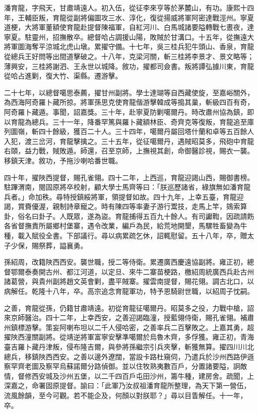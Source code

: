 \begin{pinyinscope}
潘育龍，字飛天，甘肅靖遠人。初入伍，從征李來亨等於茅麓山，有功。康熙十四年，王輔臣叛，育龍從副將偏圖攻三水、淳化，復從揚威將軍阿密達戰涇州。寧夏道梗，大將軍董額使育龍赴提督陳福軍，自紅河川、白馬城諸要隘轉戰七晝夜，達寧夏。駐靈州，招撫散卒。總督哈占調援山陽，敗賊於甘溝口。十五年，從撫遠大將軍圖海奪平涼城北虎山墩。累擢守備。十七年，吳三桂兵犯牛頭山、香泉，育龍從總兵王好問等出間道擊破之。十八年，克梁河關，斬三桂將李景才、景文略等；薄興安，三桂將謝泗、王永世以城降。敘功，擢都司僉書。叛將譚弘據川東，育龍從哈占進剿，復大竹、渠縣。遷游擊。

二十七年，以總督噶思泰薦，擢甘州副將。學士達瑚等自西藏使旋，至嘉峪關外，為西海阿奇羅卜藏所掠。將軍孫思克使育龍偕游擊韓成等搗其巢，斬級四百有奇，阿奇羅卜藏遁。事聞，詔嘉獎。三十年，赴寧夏防剿噶爾丹。時改肅州協為鎮，即以育龍為總兵。三十一年，降番罕篤與羅卜藏額林臣、奇齊克等復叛，育龍追至庫列圖嶺，斬四十餘級，獲百二十人。三十四年，噶爾丹屬回塔什蘭和卓等五百餘人入犯，渡三岔河，育龍擊擒之。三十五年，從征噶爾丹，遇賊昭莫多，飛砲中育龍右頤，益力戰，賊敗遁。師還，召至京師，上撫視其創，命御醫診視，賜衣一襲。移鎮天津。敘功，予拖沙喇哈番世職。

四十年，擢陜西提督，賜孔雀翎。四十二年，上西巡，育龍迎謁山西，賜御書榜。駐蹕渭南，閱固原將卒校射，顧大學士馬齊等曰：「朕巡歷諸省，綠旗無如潘育龍兵者。」命加秩。尋特授鎮綏將軍，領提督如故。四十九年，上幸五臺，育龍迎謁，賞賚優渥，親制詩章寵之。時有陳四等率妻子游行鬻技，走馬上竿，鵕索算卦，俗名曰卦子。人既眾，遂為盜。育龍捕得五百九十餘人。有司讞鞫，因疏請飭各省督撫責所屬鄉村堡寨，遇令改業，編戶為民，給荒地開墾，馬騾牲畜變為牛種，載入賦役全書。下部議行。尋以病累疏乞休，詔輒慰留。五十八年，卒，贈太子少保，賜祭葬，謚襄勇。

孫紹周，改籍陜西西安。襲世職，授二等侍衛。累遷廣西慶遠協副將。雍正初，總督鄂爾泰奏開古州、都江河道，以定旦、來牛二寨苗梗路，檄紹周統廣西兵赴古州諸葛營，與貴州副將趙文英會剿，盡平賊寨。擢雲南提督，賜花翎。調古北口，以病解任。乾隆十八年，卒。高宗追念育龍軍功，特予恩騎尉世職，以紹周子忱嗣。

之善，育龍從孫，仍籍甘肅靖遠。初從育龍征噶爾丹。昭莫多之役，力戰中槍，詔來京師醫治。四十二年，上幸西安，之善迎謁臨潼，授藍翎侍衛，賜孔雀翎。補肅州鎮標游擊。策妄阿喇布坦以二千人侵哈密，之善率兵二百擊敗之。上嘉其勇，超擢陜西潼關副將。從靖逆將軍富寧安擊準噶爾於烏魯木齊，多俘獲。雍正初，青海臺吉羅卜藏丹津叛，侵布隆吉爾，與參將孫繼宗引兵夾擊，斬獲無算。擢四川川北總兵，移鎮陜西西安。之善以邊外遼闊，當設卡路杜窺伺，乃遣兵於沙州西路伊遜察罕齊老圖及察罕烏蘇諾爾分路偵御。並以住牧熟夷數百戶，分置諸要隘，詗敵情，督修西安城及沙州五堡，以二千四百戶屯田沙州，籌牛種，建房舍。疏聞，上深嘉之，命署固原提督。諭曰：「此軍乃汝叔祖潘育龍所整理，為天下第一營伍，流風餘韻，至今可觀。若不能企及，何顏以對朕耶？」尋以目眚解任。十一年，卒。


\end{pinyinscope}

